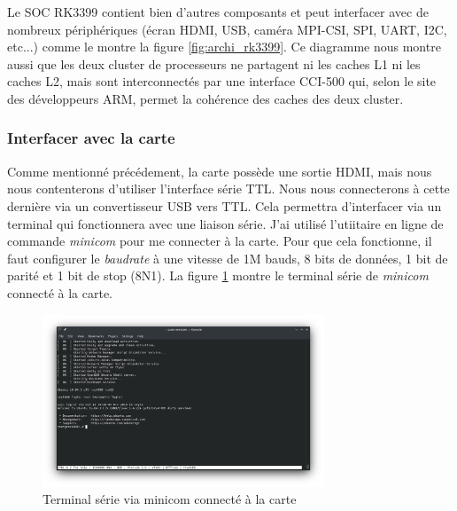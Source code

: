 Le SOC RK3399 contient bien d'autres composants et peut interfacer avec de nombreux périphériques (écran HDMI, USB, caméra MPI-CSI, SPI, UART, I2C, etc...) comme le montre la figure \ref{fig:archi_rk3399}. Ce diagramme nous montre aussi que les deux \gls{cluster} de processeurs ne partagent ni les caches L1 ni les caches L2, mais sont interconnectés par une interface CCI-500 qui, selon le site des développeurs ARM, permet la cohérence des caches des deux cluster.


\subsubsection{Interfacer avec la carte}

Comme mentionné précédement, la carte possède une sortie HDMI, mais nous nous contenterons d'utiliser l'interface série TTL. Nous nous connecterons à cette dernière via un convertisseur USB vers TTL. Cela permettra d'interfacer via un terminal qui fonctionnera avec une liaison série. J'ai utilisé l'utiitaire en ligne de commande \textit{minicom} pour me connecter à la carte. Pour que cela fonctionne, il faut configurer le \textit{baudrate} à une vitesse de 1M bauds, 8 bits de données, 1 bit de parité et 1 bit de stop (8N1).
La figure \ref{fig:terminal} montre le terminal série de \textit{minicom} connecté à la carte.


\begin{figure}[H]
    \centering
    \includegraphics[width=0.75\textwidth]{Images/CaptureTerminalMinicom.png}
    \caption{Terminal série via minicom connecté à la carte}
    \label{fig:terminal}
\end{figure}


